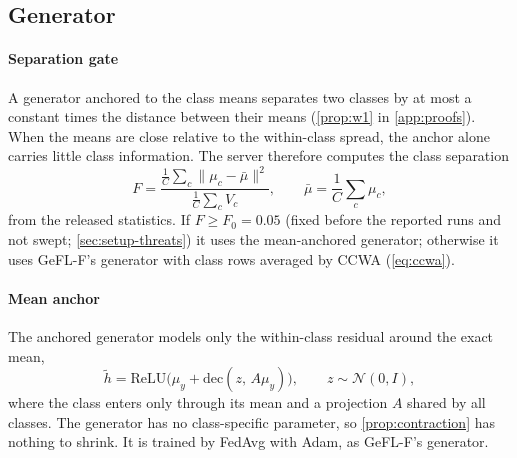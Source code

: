\subsection{Generator}\label{sec:method-gen}

\paragraph{Separation gate} A generator anchored to the class means separates two classes by at most a constant times
the distance between their means (\cref{prop:w1} in \cref{app:proofs}). When the means are close relative to the
within-class spread, the anchor alone carries little class information. The server therefore computes the class
separation
\begin{equation}\label{eq:gate}
F=\frac{\frac1C\sum_c\|\mu_c-\bar\mu\|^2}{\frac1C\sum_c V_c},\qquad \bar\mu=\frac1C\sum_c\mu_c,
\end{equation}
from the released statistics. If $F\ge F_0=0.05$ (fixed before the reported runs and not swept; \cref{sec:setup-threats}) it uses the mean-anchored generator; otherwise it uses GeFL-F's
generator with class rows averaged by CCWA (\cref{eq:ccwa}). 

\paragraph{Mean anchor} The anchored generator models only the within-class residual around the exact mean,
\begin{equation}\label{eq:anchor}
\tilde h=\mathrm{ReLU}\big(\mu_y+\mathrm{dec}(z,\,A\mu_y)\big),\qquad z\sim\mathcal N(0,I),
\end{equation}
where the class enters only through its mean and a projection $A$ shared by all classes. The generator has no
class-specific parameter, so \cref{prop:contraction} has nothing to shrink. It is trained by FedAvg with Adam, as
GeFL-F's generator.

